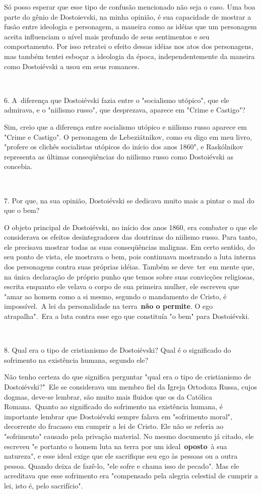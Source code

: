 Só posso esperar que esse tipo de confusão mencionado não seja o caso.
Uma boa parte do gênio de Dostoievski, na minha opinião, é sua
capacidade de mostrar a fusão entre ideologia e personagem, a maneira
como as idéias que um personagem aceita influenciam o nível mais
profundo de seus sentimentos e seu comportamento. Por isso retratei o
efeito dessas idéias nos atos dos personagens, mas também tentei esboçar
a ideologia da época, independentemente da maneira como Dostoiévski a
usou em seus romances.

~

6. A~diferença que Dostoiévski fazia entre o "socialismo utópico", que
ele admirava, e o "niilismo russo", que desprezava, aparece em "Crime e
Castigo"?

Sim, creio que a diferença entre socialismo utópico e niilismo russo
aparece em "Crime e Castigo". O personagem de Lebeziátnikov, como eu
digo em meu livro, "profere os clichês socialistas utópicos do início
dos anos 1860", e Raskólnikov representa as últimas conseqüências do
niilismo russo como Dostoiévski as concebia.

~

7. Por que, na sua opinião, Dostoiévski se dedicava muito mais a pintar
o mal do que o bem?

O objeto principal de Dostoiévski, no início dos anos 1860, era combater
o que ele considerava os efeitos desintegradores das doutrinas do
niilismo russo. Para tanto, ele precisava mostrar todas as suas
conseqüências malignas. Em certo sentido, do seu ponto de vista, ele
mostrava o bem, pois continuava mostrando a luta interna dos personagens
contra suas próprias idéias. Também se deve~ter~em mente que, na única
declaração de próprio punho que temos sobre suas convicções religiosas,
escrita enquanto ele velava o corpo de sua primeira mulher, ele escreveu
que "amar ao homem como a si mesmo, segundo o mandamento de Cristo, é
impossível.~A lei da personalidade na terra~\textbf{não o permite}. O
ego atrapalha".~Era a luta contra esse ego que constituía "o bem" para
Dostoiévski.

~

8. Qual era o tipo de cristianismo de Dostoiévski? Qual é o significado
do sofrimento na existência humana, segundo ele?

Não tenho certeza do que significa perguntar "qual era o tipo de
cristianismo de Dostoiévski?"~Ele se considerava um membro fiel da
Igreja Ortodoxa Russa, cujos dogmas, deve-se lembrar, são muito mais
fluidos que os da Católica Romana.~Quanto ao significado do sofrimento
na existência humana, é importante lembrar que Dostoiévski sempre falava
em "sofrimento moral", decorrente do fracasso em cumprir a lei de
Cristo. Ele não se referia ao "sofrimento" causado pela privação
material. No mesmo documento já citado, ele escreveu "e portanto o homem
luta na terra por um ideal~{\textbf{oposto}~}à sua natureza", e esse
ideal exige que ele sacrifique seu ego às pessoas ou a outra pessoa.
Quando deixa de fazê-lo, "ele sofre e chama isso de pecado". Mas ele
acreditava que esse sofrimento era "compensado pela alegria celestial de
cumprir a lei, isto é, pelo sacrifício".

